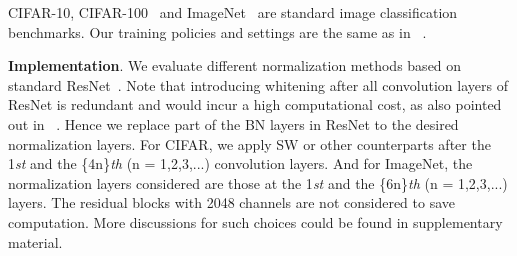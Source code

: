 \documentclass[10pt,twocolumn,letterpaper]{article}
\begin{document}
\setlength{\tabcolsep}{4pt}
\begin{table}[!t]
	\begin{center}
		\caption{Test errors (\%) on CIFAR-10/100 and ImageNet validation sets~\cite{krizhevsky2009learning}. For each model, we evaluate different normalization or whitening methods. $\text{SW}^{a}$ and $\text{SW}^{b}$ correspond to \(\Omega = \) \{bw, iw\} and \(\Omega = \) \{bw, iw, bn, in, ln\} respectively. Results on CIFAR are averaged over 5 runs.}
		\label{cifar}
	\end{center}
	\vspace{-16pt}
\end{table}
\setlength{\tabcolsep}{1.4pt}




CIFAR-10, CIFAR-100~\cite{krizhevsky2009learning} and ImageNet~\cite{deng2009imagenet} are standard image classification benchmarks.
Our training policies and settings are the same as in ~\cite{he2016deep}.

\noindent\textbf{Implementation}.
We evaluate different normalization methods based on standard ResNet~\cite{he2016deep}.
Note that introducing whitening after all convolution layers of ResNet is redundant and would incur a high computational cost, as also pointed out in ~\cite{lei2018decorrelated}.
Hence we replace part of the BN layers in ResNet to the desired normalization layers.
For CIFAR, we apply SW or other counterparts after the 1\textit{st} and the \{4n\}\textit{th} (n = 1,2,3,...) convolution layers.
And for ImageNet, the normalization layers considered are those at the 1\textit{st} and the \{6n\}\textit{th} (n = 1,2,3,...) layers.
The residual blocks with 2048 channels are not considered to save computation.
More discussions for such choices could be found in supplementary material.
\end{document}
